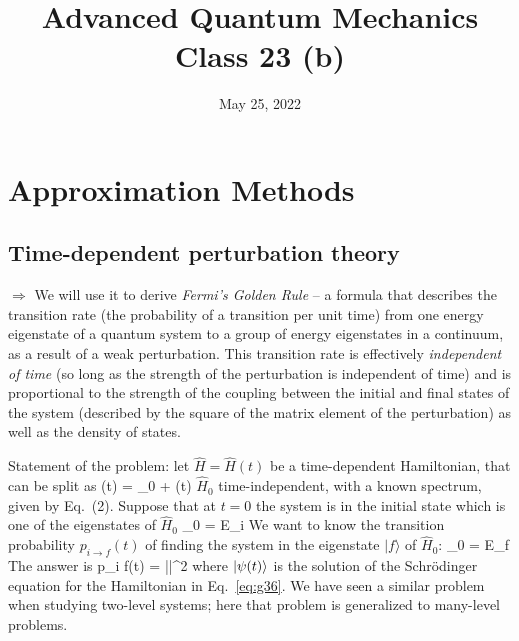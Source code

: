 \documentclass[12pt]{article}
\title{Advanced Quantum Mechanics\\Class 23 (b)}
\date{May 25, 2022}                                           %
\begin{document}
\maketitle

\setcounter{section}{4}
\setcounter{equation}{35}

\section{Approximation Methods}

\setcounter{subsection}{1}
\subsection{Time-dependent perturbation theory}

$\Rightarrow$ We will use it to derive \emph{Fermi's Golden Rule} -- a formula that describes
the transition rate (the probability of a transition per unit time) 
from one energy eigenstate of a quantum system 
to a group of energy eigenstates in a continuum, as a result of a weak perturbation.
This transition rate is effectively \emph{independent of time} 
(so long as the strength of the perturbation is independent of time) 
and is proportional 
to the strength of the coupling between the initial and final states of the system 
(described by the square of the matrix element of the perturbation) 
as well as the density of states.

Statement of the problem: let $\hat{H} = \hat{H}(t)$ be a time-dependent Hamiltonian,
that can be split as
\be
{}(t) = _0 + \lambda {}(t)
\label{eq:g36}
\ee
$\hat{H}_0$ time-independent, with a known spectrum, given
by Eq.~(2). Suppose that at $t=0$ the system is
in the initial state
\be
{} \equiv {}
\ee
which is one of the eigenstates of $\hat{H}_0$
\be
{}_0  = E_i 
\ee
We want to know the transition probability $p_{i \rightarrow f}(t)$ of finding
the system in the eigenstate $|f\rangle$ of $\hat{H}_{0}$:
\be
{}_0  = E_f 
\ee
The answer is
\be
p_{i \rightarrow f}(t) = ||^2
\label{eq:g40}
\ee
where $\ket{\psi(t)}$ is the solution of the Schrödinger equation
for the Hamiltonian in Eq.~\eqref{eq:g36}.
We have seen a similar problem when
studying two-level systems; here that
problem is generalized to many-level problems.
\end{document}
